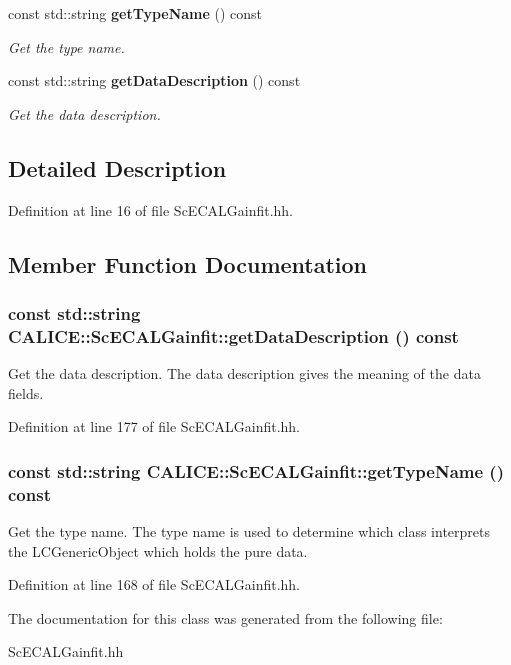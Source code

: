 \begin{DoxyCompactItemize}
\item 
const std::string {\bf getTypeName} () const 
\begin{DoxyCompactList}\small\item\em Get the type name. \item\end{DoxyCompactList}\item 
const std::string {\bf getDataDescription} () const 
\begin{DoxyCompactList}\small\item\em Get the data description. \item\end{DoxyCompactList}\end{DoxyCompactItemize}


\subsection{Detailed Description}


Definition at line 16 of file ScECALGainfit.hh.

\subsection{Member Function Documentation}
\subsubsection[{getDataDescription}]{\setlength{\rightskip}{0pt plus 5cm}const std::string CALICE::ScECALGainfit::getDataDescription () const\hspace{0.3cm}{\ttfamily  [inline]}}\label{classCALICE_1_1ScECALGainfit_ad2727458ef41670afd5f0a72f912f47c}


Get the data description. The data description gives the meaning of the data fields. 

Definition at line 177 of file ScECALGainfit.hh.
\subsubsection[{getTypeName}]{\setlength{\rightskip}{0pt plus 5cm}const std::string CALICE::ScECALGainfit::getTypeName () const\hspace{0.3cm}{\ttfamily  [inline]}}\label{classCALICE_1_1ScECALGainfit_ac669b4fd2691b355c8f37e764ebb2534}


Get the type name. The type name is used to determine which class interprets the LCGenericObject which holds the pure data. 

Definition at line 168 of file ScECALGainfit.hh.

The documentation for this class was generated from the following file:\begin{DoxyCompactItemize}
\item 
ScECALGainfit.hh\end{DoxyCompactItemize}

